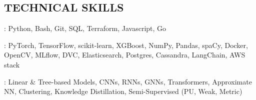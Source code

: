 \documentclass[resmargin]{resume_style_class} %
\newenvironment{outline-cond}
  {\begin{list}{}{
  \setlength{\leftmargin}{30pt}
  \setlength\topsep{-10pt}
  \setlength\itemindent{-30pt}
  }}
  {\end{list}}
\begin{document}
\begin{resume}
\section{TECHNICAL SKILLS}
\begin{outline-cond} 
	\item {}: Python, Bash, Git, SQL, Terraform, Javascript, Go
	\item {}: PyTorch, TensorFlow, scikit-learn, XGBoost, NumPy, Pandas, spaCy, Docker, OpenCV, MLflow, DVC, Elasticsearch, Postgres, Cassandra, LangChain, AWS stack
	\item {}: Linear \& Tree-based Models, CNNs, RNNs, GNNs, Transformers, Approximate NN, Clustering, Knowledge Distillation, Semi-Supervised (PU, Weak, Metric)
\end{outline-cond} 



\end{resume}
\end{document}
